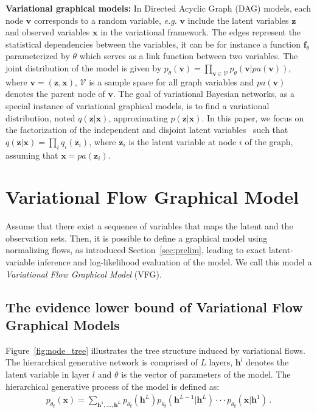 \documentclass{article} %
\begin{document}
\vspace{0.08in}
\textbf{Variational graphical models:}
In Directed Acyclic Graph (DAG) models, each node $\mathbf{v}$ corresponds to a random variable, \textit{e.g.} $\mathbf{v}$ include the latent variables $\mathbf{z}$ and observed variables $\mathbf{x}$ in the variational framework. 
The edges represent the statistical dependencies between the variables, it can be for instance a function $\mathbf{f}_\theta$ parameterized by $\theta$ which serves as a link function between two variables.  
The joint distribution of the model is given by $p_\theta(\mathbf{v}) = \prod_{\mathbf{v} \in \mathcal{V}} p_\theta(\mathbf{v}|pa(\mathbf{v}))$, where $\mathbf{v}=(\mathbf{z}, \mathbf{x})$, $\mathcal{V}$ is a sample space for all graph variables and $pa(\mathbf{v})$ denotes the parent node of $\mathbf{v}$. 
The goal of variational Bayesian networks, as a special instance of variational graphical models, is to find a variational distribution, noted $q(\mathbf{z}|\mathbf{x})$, approximating $p(\mathbf{z}|\mathbf{x})$. 
In this paper, we focus on the factorization of the independent and disjoint latent variables~\citep{bishop2003vibes} such that $q(\mathbf{z}|\mathbf{x}) = \prod_i q_i(\mathbf{z}_i)$, where $\mathbf{z}_i$ is the latent variable at node $i$ of the graph, assuming that $\mathbf{x}=pa(\mathbf{z}_i)$. 
\vspace{-0.05in}
\section{Variational Flow Graphical Model}\label{sec:main}
\vspace{-0.05in}

Assume that there exist a sequence of variables that maps the latent and the observation sets.
Then, it is possible to define a graphical model using normalizing flows, as introduced Section~\ref{sec:prelim}, leading to exact latent-variable inference and log-likelihood evaluation of the model. 
We call this model a \textit{Variational Flow Graphical Model} (VFG).

\subsection{The evidence lower bound of Variational Flow Graphical Models}
Figure~\ref{fig:node_tree} illustrates the tree structure induced by variational flows.  
The hierarchical generative network is comprised of $L$ layers, $\mathbf{h}^l$ denotes the latent variable in layer $l$ and $\theta$ is the vector of parameters of the model. 
The hierarchical generative process of the model is defined as:
\begin{align*}
p_{\theta_{\mathbf{f}}}(\mathbf{x}) = \sum_{\mathbf{h}^1, ..., \mathbf{h}^L} p_{\theta_{\mathbf{f}}}(\mathbf{h}^L)p_{\theta_{\mathbf{f}}}(\mathbf{h}^{L-1} | \mathbf{h}^{L}) \cdot \cdot  \cdot  p_{\theta_{\mathbf{f}}}(\mathbf{x} | \mathbf{h}^{1}) \, .
\end{align*}
\end{document}
